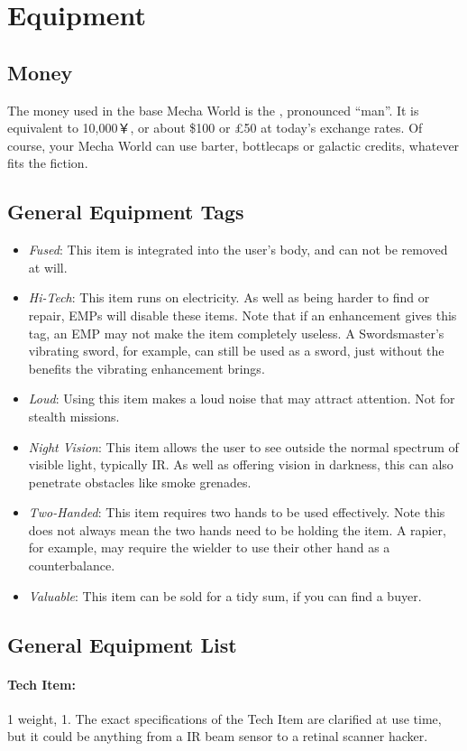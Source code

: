 \section{Equipment}
\subsection{Money}
The money used in the base Mecha World is the \money, pronounced ``man''. It is equivalent to 10,000￥, or about \$100 or £50 at today's exchange rates. Of course, your Mecha World can use barter, bottlecaps or galactic credits, whatever fits the fiction.

\subsection{General Equipment Tags}
\begin{itemize}
\item \textit{Fused}: This item is integrated into the user's body, and can not be removed at will.
\item \textit{Hi-Tech}: This item runs on electricity. As well as being harder to find or repair, EMPs will disable these items. Note that if an enhancement gives this tag, an EMP may not make the item completely useless. A Swordsmaster's vibrating sword, for example, can still be used as a sword, just without the benefits the vibrating enhancement brings.
\item \textit{Loud}: Using this item makes a loud noise that may attract attention. Not for stealth missions.
\item \textit{Night Vision}: This item allows the user to see outside the normal spectrum of visible light, typically IR. As well as offering vision in darkness, this can also penetrate obstacles like smoke grenades. 
\item \textit{Two-Handed}: This item requires two hands to be used effectively. Note this does not always mean the two hands need to be holding the item. A rapier, for example, may require the wielder to use their other hand as a counterbalance. 
\item \textit{Valuable}: This item can be sold for a tidy sum, if you can find a buyer.
\end{itemize}

\subsection{General Equipment List}
\paragraph{Tech Item:} 1 weight, 1\money. The exact specifications of the Tech Item are clarified at use time, but it could be anything from a IR beam sensor to a retinal scanner hacker.

